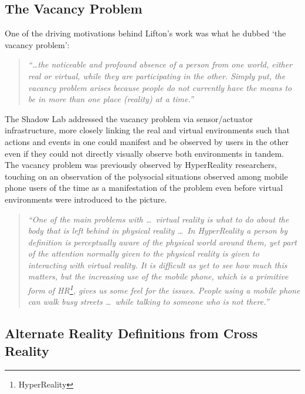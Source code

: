 
\subsection{The Vacancy Problem}
\label{background-vacancy-problem}
One of the driving motivations behind Lifton's work was what he dubbed `the vacancy problem':

\begin{quote}
\textit{``\ldots the noticeable and profound absence of a person from one world, either real or virtual, while they are participating in the other. Simply put, the vacancy problem arises because people do not currently have the means to be in more than one place (reality) at a time.''}~\cite{Lifton2007a}
\end{quote}

The Shadow Lab addressed the vacancy problem via sensor/actuator infrastructure, more closely linking the real and virtual environments such that actions and events in one could manifest and be observed by users in the other even if they could not directly visually observe both environments in tandem. The vacancy problem was previously observed by HyperReality researchers, touching on an observation of the polysocial situations observed among mobile phone users of the time as a manifestation of the problem even before virtual environments were introduced to the picture. %

\begin{quote}
	\textit{``One of the main problems with \ldots\ virtual reality is what to do about the body that is left behind in physical reality \ldots\ In HyperReality a person by definition is perceptually aware of the physical world around them, yet part of the attention normally given to the physical reality is given to interacting with virtual reality. It is difficult as yet to see how much this matters, but the increasing use of the mobile phone, which is a primitive form of HR\footnote{HyperReality}, gives us some feel for the issues. People using a mobile phone can walk busy streets \ldots\ while talking to someone who is not there.''}~\cite{Terashima2001}
\end{quote}


\subsection{Alternate Reality Definitions from Cross Reality}

